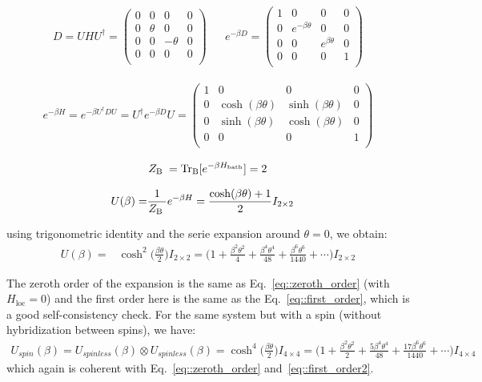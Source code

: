 \documentclass[10pt,letter]{article}
\begin{document}
\begin{align}
D = U H U^\dagger=
\begin{pmatrix}
0&0&0&0\\
0&\theta&0&0\\
0&0&-\theta&0\\
0&0&0&0\\
\end{pmatrix}
&&
e^{-\beta D} =
\begin{pmatrix}
1&0&0&0\\
0&e^{-\beta \theta}&0&0\\
0&0&e^{\beta \theta}&0\\
0&0&0&1\\
\end{pmatrix}
\end{align}

\begin{align}
e^{-\beta H} = e^{-\beta U^\dagger D U} = U^\dagger e^{-\beta D} U  =
\begin{pmatrix}
1&0&0&0\\
0&\cosh(\beta \theta)&\sinh(\beta \theta)&0\\
0&\sinh(\beta \theta)&\cosh(\beta \theta)&0\\
0&0&0&1\\
\end{pmatrix}
\end{align}

\begin{align}
Z_{\text {B }} = \operatorname{Tr_B}[ e^{-\beta H_\text{bath} }  ] = 2
\end{align}

\begin{align}
U(\beta)=& \frac{1}{Z_{\text {B }}} e^{-\beta H} = \frac{\cosh(\beta \theta)+1}{2} I_{2 \times 2}
\end{align}

using trigonometric identity and the serie expansion around $\theta=0$, we obtain:
\begin{align}
U(\beta)=& \cosh^2\bigg(\frac{\beta \theta}{2}\bigg) I_{2 \times 2}
=
\bigg(
1
+\frac{\beta^{2} \theta^{2}}{4}
+\frac{\beta^{4} \theta^{4}}{48}
+\frac{\beta^{6} \theta^{6}}{1440}
+\cdots \bigg)
I_{2 \times 2}
\end{align}

The zeroth order of the expansion is the same as Eq.~\eqref{eq::zeroth_order} (with $H_\text{loc}=0$) and the
first order here is the same as the Eq.~\eqref{eq::first_order}, which is a good self-consistency check. For the same system but with a spin (without hybridization between spins), we have:
\begin{align}
U_{spin}(\beta)= U_{spinless}(\beta) \otimes  U_{spinless}(\beta) = \cosh^4\bigg(\frac{\beta \theta}{2}\bigg) I_{4 \times 4}
=
\bigg(
1
+\frac{\beta^{2} \theta^{2}}{2}
+\frac{5 \beta^{4} \theta^{4}}{48}
+\frac{17 \beta^{6} \theta^{6}}{1440}
+\cdots \bigg)
I_{4 \times 4}
\end{align}
which again is coherent with Eq.~\eqref{eq::zeroth_order} and~\eqref{eq::first_order2}.
\end{document}
